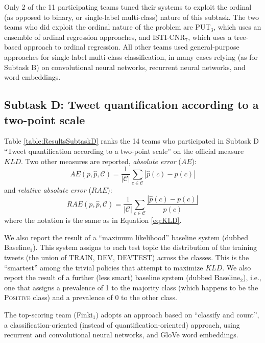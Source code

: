 \documentclass[11pt,letterpaper]{article}
\begin{document}
Only 2 of the 11 participating teams tuned their systems to exploit
the ordinal (as opposed to binary, or single-label multi-class) nature
of this subtask. The two teams who did exploit the ordinal nature of
the problem are PUT$_{3}$, which uses an ensemble of ordinal
regression approaches, and ISTI-CNR$_{7}$, which uses a
tree-based approach to ordinal regression. All other teams used
general-purpose approaches for single-label multi-class
classification, in many cases relying (as for Subtask B) on
convolutional neural networks, recurrent neural networks, and word embeddings.


\subsection{Subtask D: Tweet quantification according to a two-point
scale}
\label{sec:4Ddiscussion}

\noindent Table \ref{table:ResultsSubtaskD} ranks the 14 teams who
participated in Subtask D ``Tweet quantification according to a
two-point scale'' on the official measure $KLD$. Two other
measures are reported, \emph{absolute error} ($AE$):
%
\begin{equation}\label{eq:AE}
  AE(p,\hat{p},\mathcal{C})=\frac{1}{|\mathcal{C}|}\sum_{c\in \mathcal{C}}|\hat{p}(c)-p(c)|
\end{equation}
%
\noindent and \emph{relative absolute error} ($RAE$):
%
\begin{equation}\label{eq:rae}
  RAE(p,\hat{p},\mathcal{C})=\frac{1}{|\mathcal{C}|}\sum_{c\in 
  \mathcal{C}}\displaystyle\frac{|\hat{p}(c)-p(c)|}{p(c)}
\end{equation}
%
\noindent where the notation is the same as in Equation
\ref{eq:KLD}. 

We also report the result of a ``maximum likelihood''
baseline system (dubbed Baseline$_1$). This system assigns to each
test topic the distribution of the training tweets (the union of
TRAIN, DEV, DEVTEST) across the classes. This is the ``smartest''
among the trivial policies that attempt to maximize $KLD$. We also
report the result of a further (less smart) baseline system (dubbed
Baseline$_2$), i.e., one that assigns a prevalence of 1 to the
majority class (which happens to be the \textsc{Positive} class) and a
prevalence of 0 to the other class.


The top-scoring team (Finki$_{1}$) adopts an approach based on
``classify and count'', a classification-oriented (instead of quantification-oriented) approach, using recurrent and convolutional
neural networks, and GloVe word embeddings.
\end{document}
